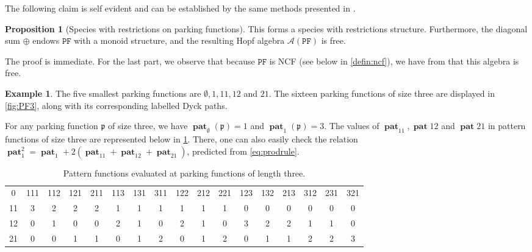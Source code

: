 \documentclass[12pt, reqno]{amsart}
\theoremstyle{definition}
\newtheorem{prop}[thm]{Proposition}
\newtheorem{smpl}[thm]{Example}
\DeclareMathOperator{\pat}{\mathbf{pat}}
\begin{document}
The following claim is self evident and can be established by the same methods presented in \cite{Penaguiao2020}.

\begin{prop}[Species with restrictions on parking functions]
This forms a species with restrictions structure.
Furthermore, the diagonal sum $\oplus $ endows $\mathtt{PF}$ with a monoid structure, and the resulting Hopf algebra $\mathcal A(\mathtt{PF})$ is free.
\end{prop}

The proof is immediate.
For the last part, we observe that because $\mathtt{PF}$ is NCF (see below in \cref{defin:ncf}), we have from \cite{Vargas} that this algebra is free.

\begin{smpl}
The five smallest parking functions are $\emptyset, 1, 11, 12$ and $21$.
The sixteen parking functions of size three are displayed in \cref{fig:PF3}, along with its corresponding labelled Dyck paths.

For any parking function $\mathfrak p$ of size three, we have $\pat_{\emptyset}(\mathfrak p) = 1$ and $\pat_1(\mathfrak p) = 3$.
The values of $\pat_{11}, \pat{12}$ and $\pat{21}$ in pattern functions of size three are represented below in \cref{tab:PF3}.
There, one can also easily check the relation $\pat_1^2 = \pat_1 + 2(\pat_{11} + \pat_{12} + \pat_{21})$, predicted from \eqref{eq:prodrule}.
\end{smpl}
\begin{table}
\begin{tabular}{ c |  c c c c c c c c c c c c c c c c}
 0  & \small{111} & \small{112} & \small{121} & \small{211} & \small{113} & \small{131} & \small{311} & \small{122} & \small{212} & \small{221} & \small{123} & \small{132} & \small{213} & \small{312} & \small{231} & \small{321}\\ 
 11 & 3 & 2 & 2 & 2 & 1 & 1 & 1 & 1 & 1 & 1 & 0 & 0 & 0 & 0 & 0 & 0 \\  
 12 & 0 & 1 & 0 & 0 & 2 & 1 & 0 & 2 & 1 & 0 & 3 & 2 & 2 & 1 & 1 & 0 \\  
 21 & 0 & 0 & 1 & 1 & 0 & 1 & 2 & 0 & 1 & 2 & 0 & 1 & 1 & 2 & 2 & 3 \end{tabular}
\caption{\label{tab:PF3}Pattern functions evaluated at parking functions of length three.}
\end{table}
\end{document}
